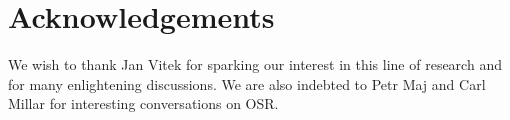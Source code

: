\section*{Acknowledgements}

We wish to thank Jan Vitek for sparking our interest in this line of research and for many enlightening discussions. We are also indebted to Petr Maj and Carl Millar for interesting conversations on OSR.
